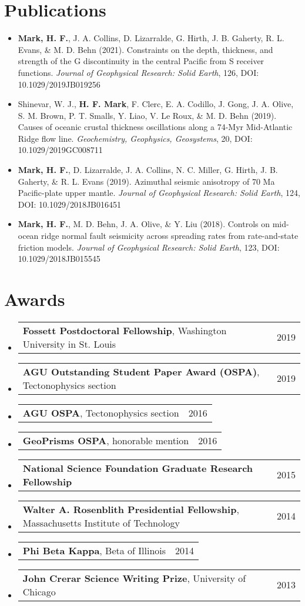 \documentclass[letterpaper,11pt]{article}
\makeatletter
\newlength\listindent
\newcommand{\resumeCite}[6]{
  \vspace{-2pt}\item 
    #1 (#2). #3. \textit{#4}, #5, DOI: #6
  \vspace{-5pt}
}
\newcommand{\resumeSmallThing}[3]{
  \vspace{-2pt}\item
    \begin{tabular*}{0.97\textwidth}[t]{l@{\extracolsep{\fill}}r}
      \textbf{#1}, {#2} & #3\\
    \end{tabular*}\vspace{-14pt}
}
\newcommand{\resumeSmallerThing}[2]{
  \vspace{-2pt}\item
    \begin{tabular*}{0.97\textwidth}[t]{l@{\extracolsep{\fill}}r}
      \textbf{#1} & #2\\
    \end{tabular*}\vspace{-14pt}
}
\newcommand{\resumeSubHeadingListStart}{\begin{itemize}[leftmargin=0.15in, label={}]}
\newcommand{\resumeSubHeadingListEnd}{\end{itemize}}
\makeatother
\begin{document}
\section{Publications}
    \resumeSubHeadingListStart
     0cm \linewidth \listindent \dimexpr\linewidth-\listindent\relax
    \resumeCite
    {\textbf{Mark, H. F.}, J. A. Collins, D. Lizarralde, G. Hirth, J. B. Gaherty, R. L. Evans, \& M. D. Behn}{2021}{Constraints on the depth, thickness, and strength of the G discontinuity in the central Pacific from S receiver functions}{Journal of Geophysical Research: Solid Earth}{126}{10.1029/2019JB019256}
    \resumeCite
    {Shinevar, W. J., \textbf{H. F. Mark}, F. Clerc, E. A. Codillo, J. Gong, J. A. Olive, S. M. Brown, P. T. Smalls, Y. Liao, V. Le Roux, \& M. D. Behn}{2019}{Causes of oceanic crustal thickness oscillations along a 74-Myr Mid-Atlantic Ridge flow line}{Geochemistry, Geophysics, Geosystems}{20}{10.1029/2019GC008711}
    \resumeCite
    {\textbf{Mark, H. F.}, D. Lizarralde, J. A. Collins, N. C. Miller, G. Hirth, J. B. Gaherty, \& R. L. Evans}{2019}{Azimuthal seismic anisotropy of 70 Ma Pacific-plate upper mantle}{Journal of Geophysical Research: Solid Earth}{124}{10.1029/2018JB016451}
    \resumeCite
    {\textbf{Mark, H. F.}, M. D. Behn, J. A. Olive, \& Y. Liu}{2018}{Controls on mid-ocean ridge normal fault seismicity across spreading rates from rate-and-state friction models}{Journal of Geophysical Research: Solid Earth}{123}{10.1029/2018JB015545}
    \resumeSubHeadingListEnd


\section{Awards}
    \resumeSubHeadingListStart
    \resumeSmallThing
      {Fossett Postdoctoral Fellowship}{Washington University in St. Louis}{2019}
    \resumeSmallThing
      {AGU Outstanding Student Paper Award (OSPA)}{Tectonophysics section}{2019}
    \resumeSmallThing
      {AGU OSPA}{Tectonophysics section}{2016}
    \resumeSmallThing
      {GeoPrisms OSPA}{honorable mention}{2016}
    \resumeSmallerThing
      {National Science Foundation Graduate Research Fellowship}{2015}
    \resumeSmallThing
      {Walter A. Rosenblith Presidential Fellowship}{Massachusetts Institute of Technology}{2014}
    \resumeSmallThing
      {Phi Beta Kappa}{Beta of Illinois}{2014}
    \resumeSmallThing
      {John Crerar Science Writing Prize}{University of Chicago}{2013}
    \resumeSubHeadingListEnd
\end{document}

